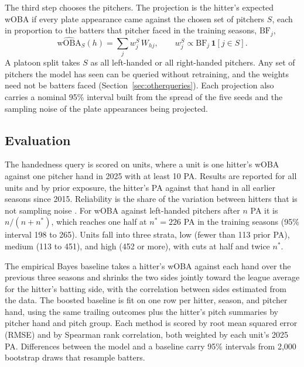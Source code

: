 The third step chooses the pitchers. The projection is the hitter's expected wOBA if every plate appearance came against the chosen set of pitchers $S$, each in proportion to the batters that pitcher faced in the training seasons, $\text{BF}_j$,
\begin{equation}
\widehat{\text{wOBA}}_S(h) = \sum_{j} w^S_j \, W_{hj}, \qquad w^S_j \propto \text{BF}_j \, \mathbf{1}[j \in S].
\label{eq:query}
\end{equation}
A platoon split takes $S$ as all left-handed or all right-handed pitchers. Any set of pitchers the model has seen can be queried without retraining, and the weights need not be batters faced (Section~\ref{sec:otherqueries}). Each projection also carries a nominal 95\% interval built from the spread of the five seeds and the sampling noise of the plate appearances being projected.

\subsection{Evaluation}
\label{sec:eval}

The handedness query is scored on units, where a unit is one hitter's wOBA against one pitcher hand in 2025 with at least 10 PA. Results are reported for all units and by prior exposure, the hitter's PA against that hand in all earlier seasons since 2015. Reliability is the share of the variation between hitters that is not sampling noise \citep{franks2016}. For wOBA against left-handed pitchers after $n$ PA it is $n/(n+n^*)$, which reaches one half at $n^* = 226$ PA in the training seasons (95\% interval 198 to 265). Units fall into three strata, low (fewer than 113 prior PA), medium (113 to 451), and high (452 or more), with cuts at half and twice $n^*$.

The empirical Bayes baseline takes a hitter's wOBA against each hand over the previous three seasons and shrinks the two sides jointly toward the league average for the hitter's batting side, with the correlation between sides estimated from the data. The boosted baseline is fit on one row per hitter, season, and pitcher hand, using the same trailing outcomes plus the hitter's pitch summaries by pitcher hand and pitch group. Each method is scored by root mean squared error (RMSE) and by Spearman rank correlation, both weighted by each unit's 2025 PA. Differences between the model and a baseline carry 95\% intervals from 2,000 bootstrap draws that resample batters.

